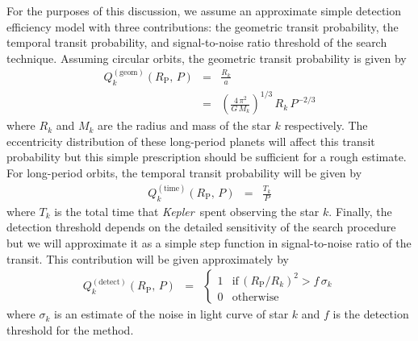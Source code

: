 \documentclass[12pt,preprint]{aastex}
\newcommand{\project}[1]{\textsl{#1}}
\newcommand{\kepler}{\project{Kepler}}
\newcommand{\eqlabel}[1]{\label{eq:#1}}
\newcommand{\period}{{\ensuremath{P}}}
\newcommand{\rp}{{\ensuremath{R_\mathrm{P}}}}
\begin{document}
For the purposes of this discussion, we assume an approximate simple detection
efficiency model with three contributions: the geometric transit probability,
the temporal transit probability, and signal-to-noise ratio threshold of the
search technique.
Assuming circular orbits, the geometric transit probability is given by
\citep{Winn:2010}
\begin{eqnarray}\eqlabel{q-geom}
Q_k^\mathrm{(geom)}(\rp,\,\period) &=& \frac{R_k}{a} \\
&=& \left( \frac{4\,\pi^2}{G\,M_k} \right)^{1/3} \, R_k \, \period^{-2/3}
\end{eqnarray}
where $R_k$ and $M_k$ are the radius and mass of the star $k$ respectively.
The eccentricity distribution of these long-period planets will affect this
transit probability \citep{Kipping:2014} but this simple prescription should
be sufficient for a rough estimate.
For long-period orbits, the temporal transit probability will be given by
\begin{eqnarray}\eqlabel{q-time}
Q_k^\mathrm{(time)}(\rp,\,\period) &=& \frac{T_k}{\period}
\end{eqnarray}
where $T_k$ is the total time that \kepler\ spent observing the star $k$.
Finally, the detection threshold depends on the detailed sensitivity of the
search procedure but we will approximate it as a simple step function in
signal-to-noise ratio of the transit.
This contribution will be given approximately by
\begin{eqnarray}
Q_k^\mathrm{(detect)}(\rp,\,\period) &=& \left\{\begin{array}{ll}
1 & \mathrm{if}\,\left(\rp/R_k\right)^2 > f\,\sigma_k \\
0 & \mathrm{otherwise}
\end{array}\right.
\end{eqnarray}
where $\sigma_k$ is an estimate of the noise in light curve of star $k$ and
$f$ is the detection threshold for the method.
\end{document}
